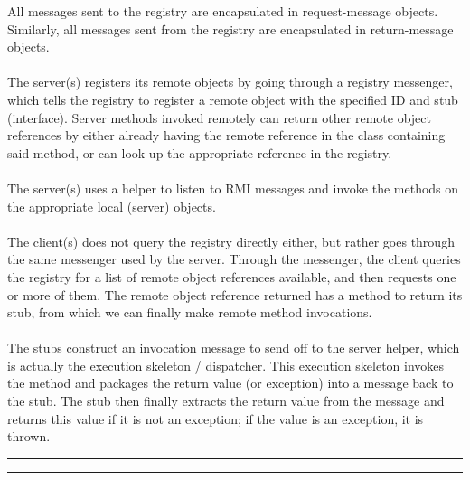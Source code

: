 \documentclass[11pt,letterpaper]{article}
\newcommand{\h}[1]
                    {\vspace{.25in} \hrule\vspace{0.5em}
                    \noindent{\bf #1 \vspace{0.5em}}
                    \hrule \vspace{.10in}
                    }
\begin{document}
All messages sent to the registry are encapsulated in request-message objects.\\
Similarly, all messages sent from the registry are encapsulated in return-message objects.\\
\\
The server(s) registers its remote objects by going through a registry messenger, which tells the registry to register a remote object with the specified ID and stub (interface). Server methods invoked remotely can return other remote object references by either already having the remote reference in the class containing said method, or can look up the appropriate reference in the registry.  \\
\\
The server(s) uses a helper to listen to RMI messages and invoke the methods on the appropriate local (server) objects.\\
\\
The client(s) does not query the registry directly either, but rather goes through the same messenger used by the server. Through the messenger, the client queries the registry for a list of remote object references available, and then requests one or more of them. The remote object reference returned has a method to return its stub, from which we can finally make remote method invocations.\\
\\
The stubs construct an invocation message to send off to the server helper, which is actually the execution skeleton / dispatcher. This execution skeleton invokes the method and packages the return value (or exception) into a message back to the stub. The stub then finally extracts the return value from the message and returns this value if it is not an exception; if the value is an exception, it is thrown.

\newpage

\h{Major Design Decisions}
\end{document}
